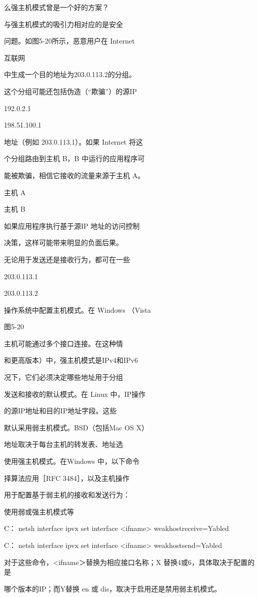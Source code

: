 么强主机模式曾是一个好的方案？

与强主机模式的吸引力相对应的是安全

问题。如图5-20所示，恶意用户在 Internet

互联网

中生成一个目的地址为203.0.113.2的分组。

这个分组可能还包括伪造（“欺骗”）的源IP

192.0.2.1

198.51.100.1

地址（例如 203.0.113.1）。如果 Internet 将这

个分组路由到主机 B，B 中运行的应用程序可

能被欺骗，相信它接收的流量来源于主机 A。

主机 A

主机 B

如果应用程序执行基于源IP 地址的访问控制

决策，这样可能带来明显的负面后果。

无论用于发送还是接收行为，都可在一些

203.0.113.1

203.0.113.2

操作系统中配置主机模式。在 Windows （Vista

图5-20

主机可能通过多个接口连接。在这种情

和更高版本）中，强主机模式是IPv4和IPv6

况下，它们必须决定哪些地址用于分组

发送和接收的默认模式。在 Linux 中，IP操作

的源IP地址和目的IP地址字段。这些

默认采用弱主机模式。BSD（包括Mac OS X）

地址取决于每台主机的转发表、地址选

使用强主机模式。在Windows 中，以下命令

择算法应用［RFC 3484］，以及主机操作

用于配置基于弱主机的接收和发送行为：

使用弱或强主机模式等

C：\> netsh interface ipvx set interface <ifname> weakhostreceive=Yabled

C：\> netsh interface ipvx set interface <ifname> weakhostsend=Yabled

对于这些命令，<ifname＞替换为相应接口名称；X 替换4或6，具体取决于配置的是

哪个版本的IP；而Y替换 en 或 dis，取决于启用还是禁用弱主机模式。

